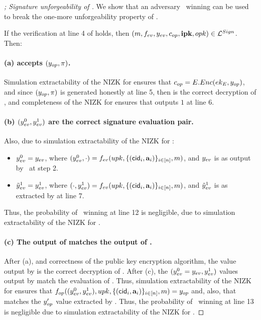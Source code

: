 \begin{proof}[; Signature unforgeability of \CUASGen]
  We show that an adversary \adv~winning \ExpForgeSign can be used to break the
  one-more unforgeability property of \SBCM.
 
  If the verification at line 4 of \ExpForgeSign holds, then $(m,f_{ev},
  y_{ev},c_{op},\mathbf{ipk},opk) \in \mathcal{L}^{Sign}$. Then:

  \paragraph{(a) \Judge accepts $(y_{op},\pi)$.} %
  Simulation extractability of the NIZK for \RelSig ensures that $c_{op} =
  E.Enc(ek_{E},y_{op})$, and since $(y_{op},\pi)$ is generated honestly at
  line 5, then \yinsp is the correct decryption of \cinsp, and completeness of
  the NIZK for \RelIns ensures that \Judge outputs $1$ at line 6.

  \paragraph{(b) $(y_{ev}^0,y_{ev}^1)$ are the correct signature evaluation
    pair.} Also, due to simulation extractability of the NIZK for \RelSig:

  \begin{itemize}
  \item $y_{ev}^0 = y_{ev}$, where $(y_{ev}^0,\cdot) = f_{ev}(upk,\lbrace
    (\mathsf{cid}_i,\mathbf{a}_i) \rbrace_{i\in[n]},m)$, and $y_{ev}$ is as output by
    \adv~at step 2.    
  \item $\tilde{y}_{ev}^1 = y_{ev}^1$, where $(\cdot,y_{ev}^1) = f_{ev}(upk,\lbrace
    (\mathsf{cid}_i,\mathbf{a}_i)\rbrace_{i\in[n]},m)$, and $\tilde{y}_{ev}^1$ is as extracted
    by \ExtractSign at line 7.
  \end{itemize}

  Thus, the probability of \adv~winning at line 12 is negligible, due to
  simulation extractability of the NIZK for \RelSig.

  \paragraph{(c) The output of \finsp matches the output of \Open.} %
  After (a), and correctness of the public key encryption algorithm, the \yinsp
  value output by \Open is the correct decryption of
  \cinsp. After (c), the $(y_{ev}^0=y_{ev},y_{ev}^1)$ values output by
  \ExtractSign match the evaluation of \feval. Thus, simulation extractability
  of the NIZK for \RelSig ensures that $f_{op}((y_{ev}^0,y_{ev}^1),upk,\lbrace
  (\mathsf{cid}_i,\mathbf{a}_i)\rbrace_{i\in[n]},m) = y_{op}$ and, also, that \yinsp
  matches the $y_{op}'$ value extracted by \ExtractSign. Thus, the probability
  of \adv~winning at line 13 is negligible due to simulation extractability
  of the NIZK for \RelSig.


\end{proof}
